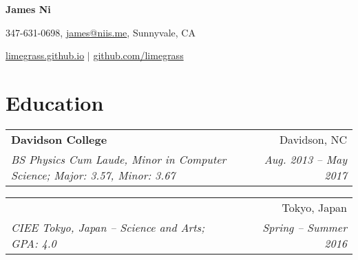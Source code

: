 \documentclass[letterpaper,11pt]{article}
\makeatletter
\newcommand{\resumeItem}[2]{
    \vspace{-2pt}
    \item\small{
        \textbf{#1}{ #2 \vspace{-2pt}}
    }
}
\newcommand{\resumeSubheading}[4]{
        \begin{tabular*}{0.97\textwidth}{l@{\extracolsep{\fill}}r}
            \textbf{#1} & #2 \\
            \textit{\small#3} & \textit{\small #4} \\
        \end{tabular*}
}
\newcommand{\resumeSubHeadingListStart}{}
\newcommand{\resumeSubHeadingListEnd}{}
\newcommand{\resumeItemListStart}{\begin{itemize}}
\newcommand{\resumeItemListEnd}{\end{itemize}}
\def\Cplusplus{C\raisebox{0.5ex}{\tiny\textbf{++}}}
\makeatother
\begin{document}

\begin{center}
    \LARGE{\textbf{James Ni}}

    \normalsize347-631-0698, \href{mailto:james@niis.me}{james@niis.me}, Sunnyvale, CA

    \normalsize\href{https://limegrass.github.io}{limegrass.github.io} $\vert$ \normalsize\href{http://github.com/limegrass}{github.com/limegrass}
\end{center}


\section{\textbf{Education}}
    \resumeSubHeadingListStart
        \resumeSubheading
            {Davidson College}{Davidson, NC}
                {BS Physics Cum Laude, Minor in Computer Science; Major: 3.57, Minor: 3.67}{Aug. 2013 -- May 2017}
        \resumeSubheading
            {Sophia University \begin{CJK}{UTF8}{min}(上智大学)\end{CJK} }{Tokyo, Japan}
            {CIEE Tokyo, Japan -- Science and Arts; GPA: 4.0}{Spring -- Summer 2016}
    \resumeSubHeadingListEnd
\end{document}
